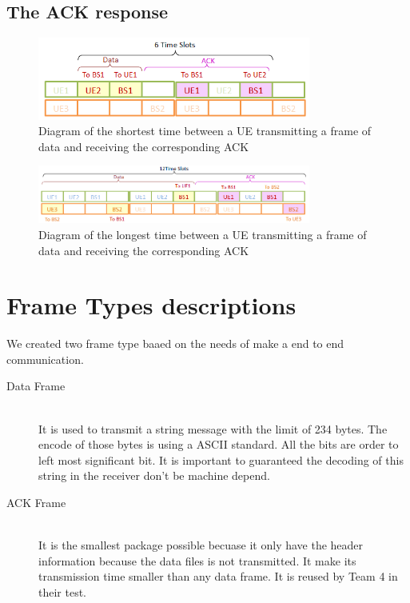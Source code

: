 \subsection {The ACK response }

\begin{figure}[ht]
    \centering
    \includegraphics[width=0.8\textwidth]{ACK_timeout_short.PNG}
    \caption{Diagram of the shortest time between a UE transmitting a frame of data and receiving the corresponding ACK}
    \label{fig:ACKtimeshort}
\end{figure}

\begin{figure}[ht]
    \centering
    \includegraphics[width=0.8\textwidth]{ACK_timeout_long.PNG}
    \caption{Diagram of the longest time between a UE transmitting a frame of data and receiving the corresponding ACK}
    \label{fig:ACKtimelong}
\end{figure}







\section{Frame Types descriptions}
We created two frame type baaed on the needs of make a end to end communication.

\begin{description}
  \item[Data Frame] \hfill \\
  It is used to transmit a string message with the limit of 234 bytes. The encode of those bytes is using a ASCII standard. All the bits are order to left most significant bit.
	It is important to guaranteed the decoding of this string in the receiver don’t be machine depend. 
	
  \item[ACK Frame] \hfill \\
  It is the smallest package possible becuase it only have the header information because the data files is not transmitted. It make its transmission time smaller than any data frame. It is reused by Team 4 in their test. 
\end{description}

